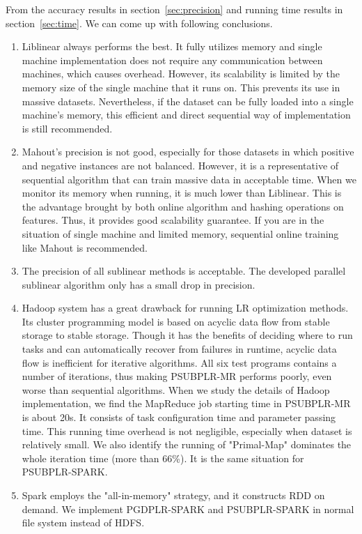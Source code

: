 \documentclass[10pt, conference, compsocconf]{IEEEtran}
\begin{document}
From the accuracy results in section~\ref{sec:precision} and running time results in section~\ref{sec:time}.
We can come up with following conclusions.
\begin{enumerate}
    \item Liblinear always performs the best. It fully utilizes memory and single machine implementation does not require any communication between machines, which causes overhead.
          However, its scalability is limited by the memory size of the single machine that it runs on. This prevents its use in massive datasets.
          Nevertheless, if the dataset can be fully loaded into a single machine's memory, this efficient and direct sequential way of implementation is still recommended.
    \item Mahout's precision is not good, especially for those datasets in which positive and negative instances are not balanced.
          However, it is a representative of sequential algorithm that can train massive data in acceptable time.
          When we monitor its memory when running, it is much lower than Liblinear. This is the advantage brought by both online algorithm and hashing operations on features.
          Thus, it provides good scalability guarantee. If you are in the situation of single machine and limited memory, sequential online training like Mahout is recommended.
    \item The precision of all sublinear methods is acceptable. The developed parallel sublinear algorithm only has a small drop in precision.
    \item Hadoop system has a great drawback for running LR optimization methods. Its cluster programming model is based on acyclic data flow from stable storage to stable storage.
          Though it has the benefits of deciding where to run tasks and can automatically recover from failures in runtime, acyclic data flow is inefficient for iterative algorithms.
          All six test programs contains a number of iterations, thus making PSUBPLR-MR performs poorly, even worse than sequential algorithms.
          When we study the details of Hadoop implementation, we find the MapReduce job starting time in PSUBPLR-MR is about 20s. It consists of task configuration time and parameter passing time.
          This running time overhead is not negligible, especially when dataset is relatively small.
          We also identify the running of "Primal-Map" dominates the whole iteration time (more than 66\%). It is the same situation for PSUBPLR-SPARK.
    \item Spark employs the "all-in-memory" strategy, and it constructs RDD on demand. We implement PGDPLR-SPARK and PSUBPLR-SPARK in normal file system instead of HDFS.

\end{enumerate}
\end{document}

